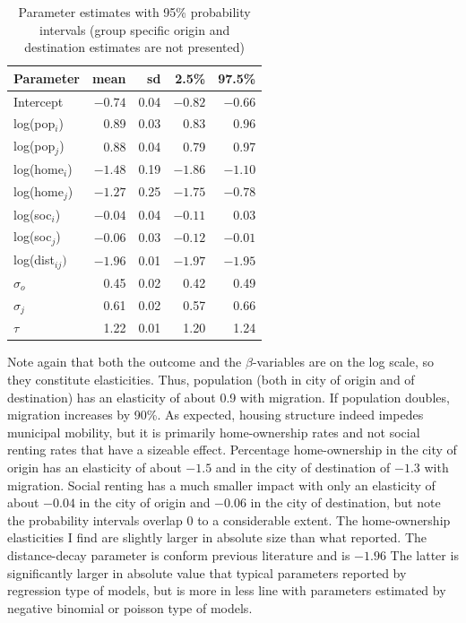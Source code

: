 \documentclass[fleqn,10pt]{SelfArx} %
\begin{document}
{{%
\begin{table}[ht]
  \centering
  \caption{Parameter estimates with 95\% probability intervals (group specific origin and destination estimates are not presented)}
  \label{tab:coef}
  \begin{tabular}{lrrrr}
    \toprule
    Parameter & mean & sd & 2.5\% & 97.5\% \\ 
    \midrule
    Intercept      & $-0.74$ & 0.04 & $-0.82$ & $-0.66$ \\ 
    log(pop$_i$)   & 0.89 & 0.03 & 0.83 & 0.96 \\ 
    log(pop$_j$)   & 0.88 & 0.04 & 0.79 & 0.97 \\ 
    log(home$_i$)  & $-1.48$ & 0.19 & $-1.86$ & $-1.10$ \\ 
    log(home$_j$)  & $-1.27$ & 0.25 & $-1.75$ & $-0.78$ \\ 
    log(soc$_i$)   & $-0.04$ & 0.04 & $-0.11$ & 0.03 \\
    log(soc$_j$)   & $-0.06$ & 0.03 & $-0.12$ & $-0.01$ \\ 
    log(dist$_{ij})$ & $-1.96$ & 0.01 & $-1.97$ & $-1.95$ \\ 
    $\sigma_o$    & 0.45 & 0.02 & 0.42 & 0.49 \\ 
    $\sigma_j$    & 0.61 & 0.02 & 0.57 & 0.66 \\ 
    $\tau$        & 1.22 & 0.01 & 1.20 & 1.24 \\ 
    \bottomrule
  \end{tabular}
\end{table}
\noindent Note again that both the outcome and the $\beta$-variables are on the log scale, so they constitute elasticities.
Thus, population (both in city of origin and of destination) has an elasticity of about 0.9 with migration. If population doubles, migration increases by 90\%. 
As expected, housing structure indeed impedes municipal mobility, but it is primarily 
home-ownership rates and not social renting rates that have a sizeable
effect. Percentage home-ownership in the city of origin has an elasticity of about $-1.5$ and in the city of destination of $-1.3$ with migration. Social renting has a much smaller impact with only an elasticity of about $-0.04$ in the city of origin and $-0.06$ in the city of destination, but note the probability intervals overlap 0 to a considerable extent. The home-ownership elasticities I find are slightly larger in absolute
size than what \citet{amirault2016drags} reported. The distance-decay parameter is conform previous literature and is $-1.96$ The latter is significantly larger in absolute value that typical parameters reported by regression type of models, but is more in less line with parameters estimated by negative binomial or poisson type of models. 

}}
\end{document}
